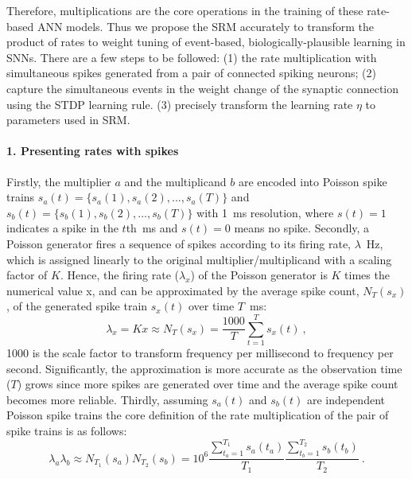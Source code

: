 Therefore, multiplications are the core operations in the training of these rate-based ANN models.
Thus we propose the SRM accurately to transform the product of rates to weight tuning of event-based, biologically-plausible learning in SNNs.
There are a few steps to be followed: (1) \DIFdelbegin {}\DIFdelend \DIFaddbegin {}\DIFaddend the rate multiplication with simultaneous spikes generated from a pair of connected spiking neurons;
(2) capture the simultaneous events in the weight change of the synaptic connection using the STDP learning rule.
(3) precisely transform the learning rate $\eta$ to parameters used in SRM.

\paragraph{1. Presenting rates with spikes\\}
Firstly, the multiplier $a$ and the multiplicand $b$ are encoded into Poisson spike trains $s_a(t)=\{s_a(1),s_a(2),...,s_a(T)\}$ and $s_b(t)=\{s_b(1),s_b(2),...,s_b(T)\}$ with 1~ms resolution, where $s(t)=1$ indicates a spike in the $t$th~ms and $s(t)=0$ means no spike.
Secondly, a Poisson generator fires a sequence of spikes according to its firing rate, $\lambda$~Hz, which is assigned linearly to the original multiplier/multiplicand \DIFdelbegin {}\DIFdelend with a scaling factor of $K$.
Hence, the firing rate ($\lambda_x$) of the Poisson generator is $K$ times the numerical value x, and can be approximated by the average spike count, $N_T(s_x)$, of the generated spike train $s_x(t)$ over time $T$~ms:
\begin{equation}
\lambda_x = Kx \approx N_T(s_x) = \frac{1000}{T} \sum_{t=1}^{T} s_x(t)~,
\end{equation} 
1000 is the scale factor to transform frequency per millisecond to frequency per second.
Significantly, the approximation is more accurate as the observation time ($T$) grows since more spikes are generated over time and the average spike count becomes more reliable.
Thirdly, assuming $s_a(t)$ and $s_b(t)$ are independent Poisson spike trains the core definition of the rate multiplication of the pair of spike trains is as follows:
\begin{equation}
\lambda_a \lambda_b \approx N_{T_1}(s_a)N_{T_2}(s_b)= 10^6 \frac{\sum_{t_a=1}^{T_1}s_a(t_a)}{T_1}  \frac{\sum_{t_b=1}^{T_2} s_b(t_b)}{T_2}~.
\label{equ:mul}
\end{equation} 

